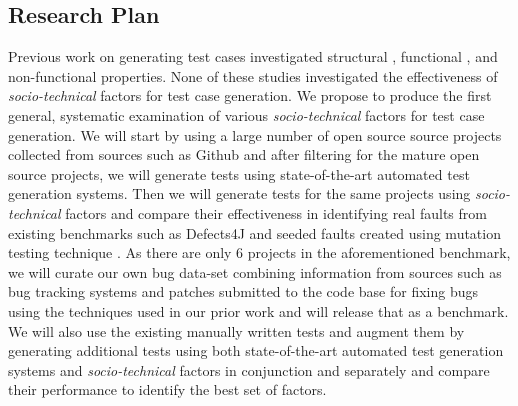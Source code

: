 \documentclass[10pt]{article}
\begin{document}
\subsection{Research Plan}

 Previous work on generating test cases investigated structural \cite{tonella2004evolutionary}, functional \cite{wegener2004evaluation}, and non-functional \cite{wegener1998verifying} properties. %
None of these studies investigated the effectiveness of \emph{socio-technical} factors for test case generation. We propose to produce the first general, systematic examination of various \emph{socio-technical} factors for test case generation. We will start by using a large number of open source source projects collected from sources such as Github and after filtering for the mature open source projects, we will generate tests using state-of-the-art automated test generation systems. Then we will generate tests for the same projects using \emph{socio-technical} factors and compare their effectiveness in identifying real faults from existing benchmarks such as Defects4J \cite{just2014defects4j} and seeded faults created using mutation testing technique \cite{ahmed2017applying}. As there are only 6 projects in the aforementioned benchmark, we will curate our own bug data-set combining information from  sources such as bug tracking systems and patches submitted to the code base for fixing bugs using the techniques used in our prior work \cite{ahmed2016can} and will release that as a benchmark. 
We will also use the existing manually written tests and augment them by generating additional tests using both state-of-the-art automated test generation systems and \emph{socio-technical} factors in conjunction and separately and compare their performance to identify the best set of factors.
\end{document}
